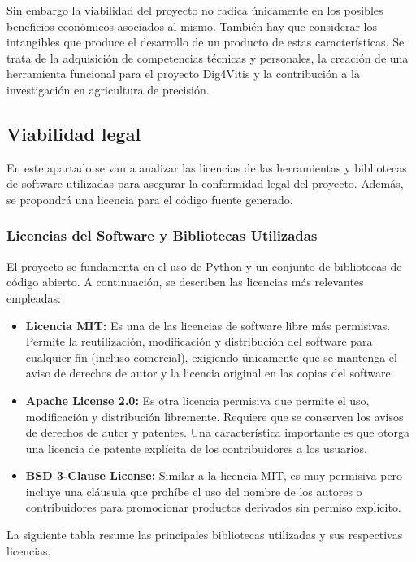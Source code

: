 Sin embargo la viabilidad del proyecto no radica únicamente en los posibles beneficios económicos asociados al mismo. También hay que considerar los intangibles que produce el desarrollo de un producto de estas características. Se trata de la adquisición de competencias técnicas y personales, la creación de una herramienta funcional para el proyecto Dig4Vitis y la contribución a la investigación en agricultura de precisión.

\subsection{Viabilidad legal}
En este apartado se van a analizar las licencias de las herramientas y bibliotecas de software utilizadas para asegurar la conformidad legal del proyecto. Además, se propondrá una licencia para el código fuente generado.

\subsubsection{Licencias del Software y Bibliotecas Utilizadas}
El proyecto se fundamenta en el uso de Python y un conjunto de bibliotecas de código abierto. A continuación, se describen las licencias más relevantes empleadas:

\begin{itemize}
    \item \textbf{Licencia MIT:} Es una de las licencias de software libre más permisivas. Permite la reutilización, modificación y distribución del software para cualquier fin (incluso comercial), exigiendo únicamente que se mantenga el aviso de derechos de autor y la licencia original en las copias del software.
    \item \textbf{Apache License 2.0:} Es otra licencia permisiva que permite el uso, modificación y distribución libremente. Requiere que se conserven los avisos de derechos de autor y patentes. Una característica importante es que otorga una licencia de patente explícita de los contribuidores a los usuarios.
    \item \textbf{BSD 3-Clause License:} Similar a la licencia MIT, es muy permisiva pero incluye una cláusula que prohíbe el uso del nombre de los autores o contribuidores para promocionar productos derivados sin permiso explícito.
\end{itemize}

La siguiente tabla resume las principales bibliotecas utilizadas y sus respectivas licencias.

